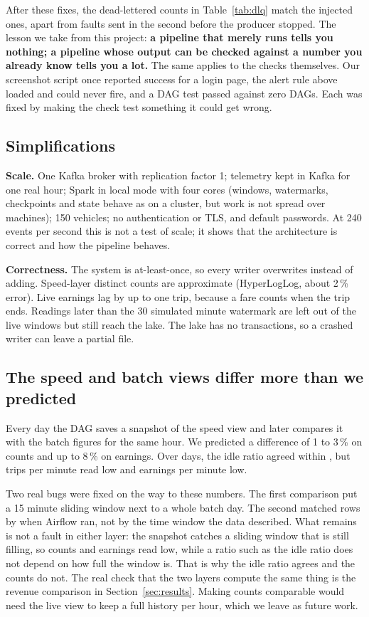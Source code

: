 \documentclass[11pt,a4paper]{article}
\begin{document}
After these fixes, the dead-lettered counts in Table~\ref{tab:dlq} match the injected
ones, apart from faults sent in the second before the producer stopped.
The lesson we take from this project: \textbf{a pipeline that merely runs tells you
nothing; a pipeline whose output can be checked against a number you already know
tells you a lot.} The same applies to the checks themselves. Our screenshot script
once reported success for a login page, the alert rule above loaded and could never
fire, and a DAG test passed against zero DAGs. Each was fixed by making the check test
something it could get wrong.

\subsection{Simplifications}

\textbf{Scale.} One Kafka broker with replication factor 1; telemetry kept in Kafka for
one real hour; Spark in local mode with four cores (windows, watermarks, checkpoints and
state behave as on a cluster, but work is not spread over machines); 150 vehicles; no
authentication or TLS, and default passwords. At 240 events per second this is not a
test of scale; it shows that the architecture is correct and how the pipeline behaves.

\textbf{Correctness.} The system is at-least-once, so every writer overwrites instead of
adding. Speed-layer distinct counts are approximate (HyperLogLog, about 2\,\% error).
Live earnings lag by up to one trip, because a fare counts when the trip ends. Readings
later than the 30 simulated minute watermark are left out of the live windows but still
reach the lake. The lake has no transactions, so a crashed writer can leave a partial
file.

\subsection{The speed and batch views differ more than we predicted}

Every day the DAG saves a snapshot of the speed view and later compares it with the
batch figures for the same hour. We predicted a difference of 1 to 3\,\% on counts and
up to 8\,\% on earnings. Over \mReconDays{} days, the idle ratio agreed within
\mReconIdle{}, but trips per minute read \mReconTrips{} low and earnings per minute
\mReconEarn{} low.

Two real bugs were fixed on the way to these numbers. The first comparison put a 15
minute sliding window next to a whole batch day. The second matched rows by when
Airflow ran, not by the time window the data described. What remains is not a fault
in either layer: the snapshot catches a sliding window that is still filling, so counts
and earnings read low, while a ratio such as the idle ratio does not depend on how full
the window is. That is why the idle ratio agrees and the counts do not. The real check
that the two layers compute the same thing is the revenue comparison in
Section~\ref{sec:results}. Making counts comparable would need the live view to keep a
full history per hour, which we leave as future work.
\end{document}
